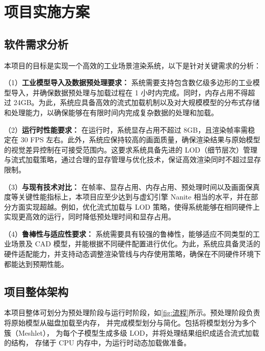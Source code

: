 \cleardoublepage

\section{项目实施方案}

\subsection{软件需求分析}

本项目的目标是实现一个高效的工业场景渲染系统，以下是针对关键需求的分析：

\par （1）\textbf{工业模型导入及数据预处理要求：}  
系统需要支持包含数亿级多边形的工业模型导入，并确保数据预处理与加载过程在 1 小时内完成。同时，内存占用不得超过 24GB。为此，系统应具备高效的流式加载机制以及对大规模模型的分布式存储和处理能力，以确保能够在有限时间内完成复杂数据的处理和加载。

\par （2）\textbf{运行时性能要求：}  
在运行时，系统显存占用不超过 8GB，且渲染帧率需稳定在 30 FPS 左右。此外，系统应保持较高的画面质量，确保渲染结果与原始模型的视觉差异控制在可接受范围内。这要求系统具备先进的 LOD（细节层次）管理与流式加载策略，通过合理的显存管理与优化技术，保证高效渲染同时不超过显存限制。

\par （3）\textbf{与现有技术对比：}  
在帧率、显存占用、内存占用、预处理时间以及画面保真度等关键性能指标上，本项目应至少达到与虚幻引擎 Nanite 相当的水平，并在部分方面实现超越。例如，优化流式加载与 LOD 策略，使得系统能够在相同硬件上实现更高效的运行，同时降低预处理时间和显存占用。

\par （4）\textbf{鲁棒性与适应性要求：}  
系统需要具有较强的鲁棒性，能够适应不同类型的工业场景及 CAD 模型，并能根据不同硬件配置进行优化。为此，系统应具备灵活的硬件适配能力，并支持动态调整渲染管线与内存使用策略，确保在不同硬件环境下都能达到预期性能。

\subsection{项目整体架构}

\par 本项目整体可划分为预处理阶段与运行时阶段，如\autoref{fig:流程}所示。预处理阶段负责将原始模型从磁盘加载至内存，  
并完成模型划分与简化。包括将模型划分为多个簇（Meshlet），  
为每个子模型生成多级 LOD，并将处理结果组织成适合流式加载的结构，  
存储于 CPU 内存中，为运行时动态加载做准备。

